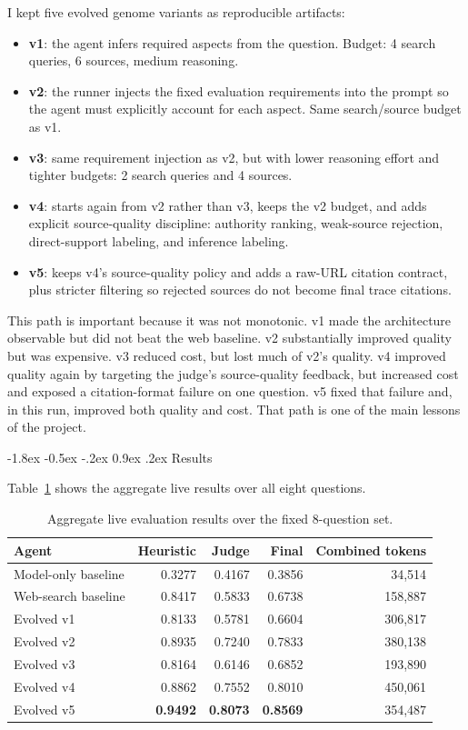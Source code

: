 \documentclass[10pt]{article}
\makeatletter
\renewcommand\section{\@startsection{section}{1}{\z@}%
  {-1.8ex \@plus -0.5ex \@minus -.2ex}%
  {0.9ex \@plus .2ex}%
  {\normalfont\large\bfseries}}
\makeatother
\begin{document}
I kept five evolved genome variants as reproducible artifacts:

\begin{itemize}
    \item \textbf{v1}: the agent infers required aspects from the question. Budget: 4 search queries, 6 sources, medium reasoning.
    \item \textbf{v2}: the runner injects the fixed evaluation requirements into the prompt so the agent must explicitly account for each aspect. Same search/source budget as v1.
    \item \textbf{v3}: same requirement injection as v2, but with lower reasoning effort and tighter budgets: 2 search queries and 4 sources.
    \item \textbf{v4}: starts again from v2 rather than v3, keeps the v2 budget, and adds explicit source-quality discipline: authority ranking, weak-source rejection, direct-support labeling, and inference labeling.
    \item \textbf{v5}: keeps v4's source-quality policy and adds a raw-URL citation contract, plus stricter filtering so rejected sources do not become final trace citations.
\end{itemize}

This path is important because it was not monotonic. v1 made the architecture observable but did not beat the web baseline. v2 substantially improved quality but was expensive. v3 reduced cost, but lost much of v2's quality. v4 improved quality again by targeting the judge's source-quality feedback, but increased cost and exposed a citation-format failure on one question. v5 fixed that failure and, in this run, improved both quality and cost. That path is one of the main lessons of the project.

\section{Results}

Table~\ref{tab:main-results} shows the aggregate live results over all eight questions.

\begin{table}[h]
\centering
\small
\begin{tabular}{lrrrr}
\toprule
Agent & Heuristic & Judge & Final & Combined tokens \\
\midrule
Model-only baseline & 0.3277 & 0.4167 & 0.3856 & 34,514 \\
Web-search baseline & 0.8417 & 0.5833 & 0.6738 & 158,887 \\
Evolved v1 & 0.8133 & 0.5781 & 0.6604 & 306,817 \\
Evolved v2 & 0.8935 & 0.7240 & 0.7833 & 380,138 \\
Evolved v3 & 0.8164 & 0.6146 & 0.6852 & 193,890 \\
Evolved v4 & 0.8862 & 0.7552 & 0.8010 & 450,061 \\
Evolved v5 & \textbf{0.9492} & \textbf{0.8073} & \textbf{0.8569} & 354,487 \\
\bottomrule
\end{tabular}
\caption{Aggregate live evaluation results over the fixed 8-question set.}
\label{tab:main-results}
\end{table}
\end{document}
